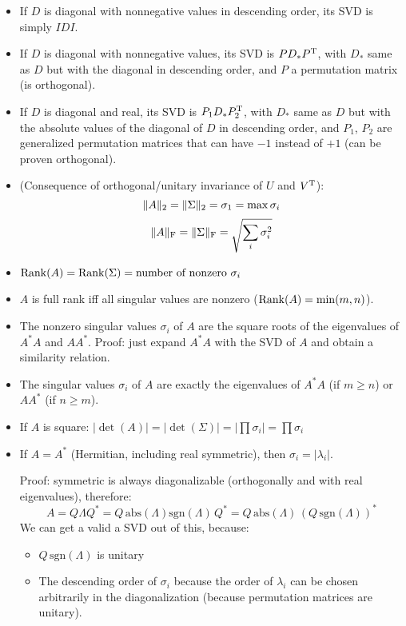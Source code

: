 \documentclass[
  12pt,
  paper=a4,
]{scrartcl} %
\begin{document}
\newpage
{}

\begin{itemize}
\item
If $D$ is diagonal with nonnegative values in descending order, its SVD is simply $I D I$.
\item
If $D$ is diagonal with nonnegative values, its SVD is $P D_{*} P^{\mathrm{T}}$, with $D_*$ same as $D$ but with the diagonal in descending order, and $P$ a permutation matrix (is orthogonal).
\item
If $D$ is diagonal and real, its SVD is $P_1 D_{*} P_2^{\mathrm{T}}$, with $D_*$ same as $D$ but with the absolute values of the diagonal of $D$ in descending order, and $P_1$, $P_2$ are generalized permutation matrices that can have $-1$ instead of $+1$ (can be proven orthogonal).
\item
(Consequence of orthogonal/unitary invariance of  $U$ and $V^{\mathrm{T}}$):
\[\|A\|_2 = \|\Sigma\|_2 = \sigma_1 = \max \sigma_i\]
\[\|A\|_{\text{F}} = \|\Sigma\|_{\text{F}} = \sqrt{\sum_i \sigma_i^2}\]
\item
$
    \operatorname{Rank}(A) =
    \operatorname{Rank}(\Sigma) =
    \text{number of nonzero $\sigma_i$}
$
\item $A$ is full rank iff all singular values are nonzero ($\operatorname{Rank}(A) = \min(m,n)$).

\item
The nonzero singular values $\sigma_i$ of $A$ are the square roots of the eigenvalues of $A^*A$ and $AA^*$. Proof: just expand $A^*A$ with the SVD of $A$ and obtain a similarity relation.

\item
The singular values $\sigma_i$ of $A$ are exactly the eigenvalues of $A^*A$ (if $m\ge n$) or $AA^*$ (if $n\ge m$).


\item If $A$ is square: $|{\det}(A)| = |{\det}(\Sigma)| = |\prod \sigma_i| = \prod \sigma_i$

\item
If $A=A^*$ (Hermitian, including real symmetric), then $\sigma_i = |\lambda_i|$.

Proof: symmetric is always diagonalizable (orthogonally and with real eigenvalues), therefore: \[
    A
    = Q\Lambda Q^* =Q \,\mathrm{abs}(\Lambda) \mathrm{sgn}(\Lambda)\, Q^*
    = Q\, \mathrm{abs}(\Lambda) \,(Q\,\mathrm{sgn}(\Lambda))^*
\]
We can get a valid a SVD out of this, because:
\begin{itemize}
    \item {} $Q\,\mathrm{sgn}(\Lambda)$ is unitary
    \item {} The descending order of $\sigma_i$ because the order of $\lambda_i$ can be chosen arbitrarily in the diagonalization (because permutation matrices are unitary).
\end{itemize}


\end{itemize}
\end{document}
